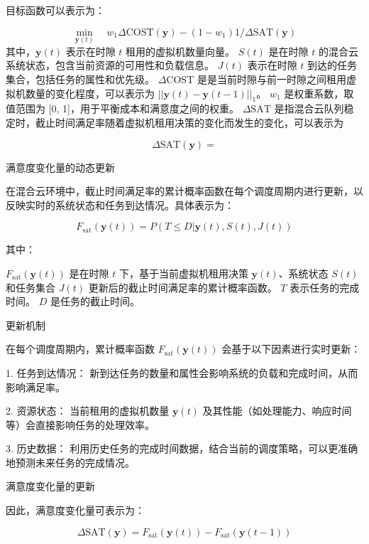 目标函数可以表示为：

\begin{equation}
    \min_{\mathbf{y}(t)} \quad w_1 \Delta \text{COST}(\mathbf{y})
    - (1 - w_1) 1/\Delta \text{SAT}(\mathbf{y})
\end{equation}
其中，$\mathbf{y}(t)$ 表示在时隙 $t$ 租用的虚拟机数量向量。
\( S(t) \) 是在时隙 $t$ 的混合云系统状态，包含当前资源的可用性和负载信息。
\( J(t) \) 表示在时隙 $t$ 到达的任务集合，包括任务的属性和优先级。
\( \Delta \text{COST} \) 是是当前时隙与前一时隙之间租用虚拟机数量的变化程度，可以表示为 \( || \mathbf{y}(t) - \mathbf{y}(t-1) ||_1 \)。
\( w_1 \) 是权重系数，取值范围为 [0, 1]，用于平衡成本和满意度之间的权重。
\( \Delta \text{SAT} \) 是指混合云队列稳定时，截止时间满足率随着虚拟机租用决策的变化而发生的变化，可以表示为

\begin{equation}
    \Delta \text{SAT}(\mathbf{y}) =
\end{equation}

满意度变化量的动态更新

在混合云环境中，截止时间满足率的累计概率函数在每个调度周期内进行更新，以反映实时的系统状态和任务到达情况。具体表示为：

\begin{equation}
    F_{\text{sat}}(\mathbf{y}(t)) = P(T \leq D | \mathbf{y}(t), S(t), J(t))
\end{equation}

其中：

\( F_{\text{sat}}(\mathbf{y}(t)) \) 是在时隙 \( t \) 下，基于当前虚拟机租用决策 \( \mathbf{y}(t) \)、系统状态 \( S(t) \) 和任务集合 \( J(t) \) 更新后的截止时间满足率的累计概率函数。
\( T \) 表示任务的完成时间。
\( D \) 是任务的截止时间。

更新机制

在每个调度周期内，累计概率函数 \( F_{\text{sat}}(\mathbf{y}(t)) \) 会基于以下因素进行实时更新：

1. 任务到达情况：
新到达任务的数量和属性会影响系统的负载和完成时间，从而影响满足率。

2. 资源状态：
当前租用的虚拟机数量 \( \mathbf{y}(t) \) 及其性能（如处理能力、响应时间等）会直接影响任务的处理效率。

3. 历史数据：
利用历史任务的完成时间数据，结合当前的调度策略，可以更准确地预测未来任务的完成情况。

满意度变化量的更新

因此，满意度变化量可表示为：

\begin{equation}
    \Delta \text{SAT}(\mathbf{y}) = F_{\text{sat}}(\mathbf{y}(t)) - F_{\text{sat}}(\mathbf{y}(t-1))
\end{equation}

